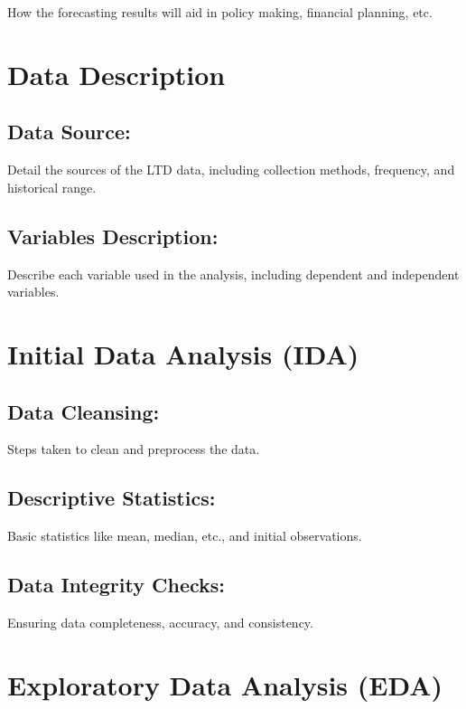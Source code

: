 \documentclass[11pt,a4paper,]{article}
\begin{document}
How the forecasting results will aid in policy making, financial planning, etc.

\section{Data Description}\label{data-description}

\subsection{Data Source:}\label{data-source}

Detail the sources of the LTD data, including collection methods, frequency, and historical range.

\subsection{Variables Description:}\label{variables-description}

Describe each variable used in the analysis, including dependent and independent variables.

\section{Initial Data Analysis (IDA)}\label{initial-data-analysis-ida}

\subsection{Data Cleansing:}\label{data-cleansing}

Steps taken to clean and preprocess the data.

\subsection{Descriptive Statistics:}\label{descriptive-statistics}

Basic statistics like mean, median, etc., and initial observations.

\subsection{Data Integrity Checks:}\label{data-integrity-checks}

Ensuring data completeness, accuracy, and consistency.

\section{Exploratory Data Analysis (EDA)}\label{exploratory-data-analysis-eda}
\end{document}
